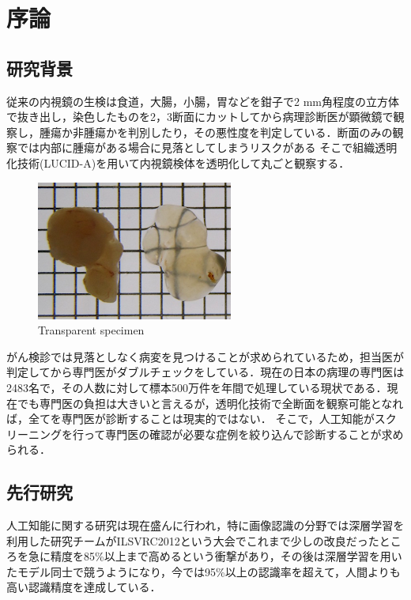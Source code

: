 \chapter{序論}
\label{chap_intro}

\section{研究背景}
従来の内視鏡の生検は食道，大腸，小腸，胃などを鉗子で2 mm角程度の立方体で抜き出し，染色したものを2，3断面にカットしてから病理診断医が顕微鏡で観察し，腫瘍か非腫瘍かを判別したり，その悪性度を判定している．断面のみの観察では内部に腫瘍がある場合に見落としてしまうリスクがある
そこで組織透明化技術(LUCID-A)\cite{sekitani2016ultraflexible}を用いて内視鏡検体を透明化して丸ごと観察する．

\begin{figure}[H]
	\centering
	\includegraphics[width=0.7\linewidth]{fig/chapter1/lucid}
	\caption{Transparent specimen}
	\label{fig:lucid}
\end{figure}

がん検診では見落としなく病変を見つけることが求められているため，担当医が判定してから専門医がダブルチェックをしている．現在の日本の病理の専門医は2483名\cite{pathology}で，その人数に対して標本500万件を年間で処理している現状である．現在でも専門医の負担は大きいと言えるが，透明化技術で全断面を観察可能となれば，全てを専門医が診断することは現実的ではない．
そこで，人工知能がスクリーニングを行って専門医の確認が必要な症例を絞り込んで診断することが求められる．

\section{先行研究}
人工知能に関する研究は現在盛んに行われ，特に画像認識の分野では深層学習\cite{lecun2015deep}を利用した研究チームがILSVRC2012という大会でこれまで少しの改良だったところを急に精度を85\%以上まで高めるという衝撃があり，その後は深層学習を用いたモデル同士で競うようになり，今では95\%以上の認識率を超えて，人間よりも高い認識精度を達成している．

